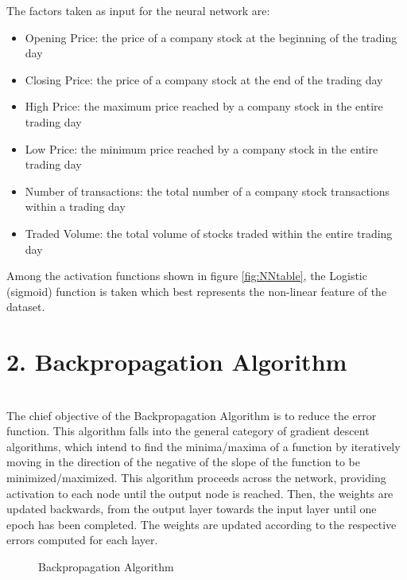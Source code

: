 The factors taken as input for the neural network are: 
\begin{itemize}
	\item Opening Price: the price of a company stock at the beginning of the trading day
	\item Closing Price: the price of a company stock at the end of the trading day 
	\item High Price: the maximum price reached by a company stock in the entire trading day
	\item Low Price: the minimum price reached by a company stock in the entire trading day
	\item Number of transactions: the total number of a company stock transactions within a trading day
	\item Traded Volume: the total volume of stocks traded within the entire trading day
\end{itemize}
Among the activation functions shown in figure \ref{fig:NNtable}, the Logistic (sigmoid) function is taken which best represents the non-linear feature of the dataset.

\chapter{\textbf{2. Backpropagation Algorithm }}\\
The chief objective of the Backpropagation Algorithm is to reduce the error function. \cite{ann} This algorithm falls into the general category of gradient descent algorithms, which intend to find the minima/maxima of a function by iteratively moving in the direction of the negative of the slope of the function to be minimized/maximized. This algorithm proceeds across the network, providing activation to each node until the output node is reached. Then, the weights are updated backwards, from the output layer towards the input layer until one epoch has been completed. The weights are updated according to the respective errors computed for each layer. 

\begin{figure}[h!]\centering
	\caption{Backpropagation Algorithm}
	\label{fig:back}
\end{figure}

